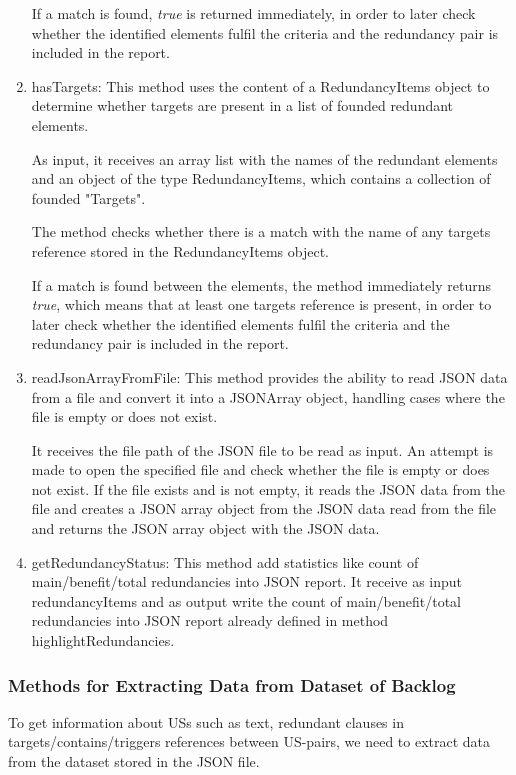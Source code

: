 \begin{enumerate}
	If a match is found, \textit{true} is returned immediately, in order to later check whether the identified elements fulfil the criteria and the redundancy pair is included in the report.
	
	\item hasTargets: This method uses the content of a RedundancyItems object to determine whether targets are present in a list of founded redundant elements.
	
	As input, it receives an array list with the names of the redundant elements and an object of the type RedundancyItems, which contains a collection of founded "Targets".
	
	The method checks whether there is a match with the name of any targets reference stored in the RedundancyItems object. 
	
	If a match is found between the elements, the method immediately returns \textit{true}, which means that at least one targets reference is present, in order to later check whether the identified elements fulfil the criteria and the redundancy pair is included in the report.
	
	\item readJsonArrayFromFile: This method provides the ability to read JSON data from a file and convert it into a JSONArray object, handling cases where the file is empty or does not exist.

	It receives the file path of the JSON file to be read as input. An attempt is made to open the specified file and check whether the file is empty or does not exist. If the file exists and is not empty, it reads the JSON data from the file and creates a JSON array object from the JSON data read from the file and returns the JSON array object with the JSON data.
	
	
	\item getRedundancyStatus: This method add statistics like count of main/benefit/total redundancies into JSON report. It receive as input redundancyItems and as output write the count of main/benefit/total redundancies into JSON report already defined in method highlightRedundancies.
\end{enumerate}
\subsubsection*{Methods for Extracting Data from Dataset of Backlog}
To get information about USs such as text, redundant clauses in targets/contains/triggers references between US-pairs, we need to extract data from the dataset stored in the JSON file.


